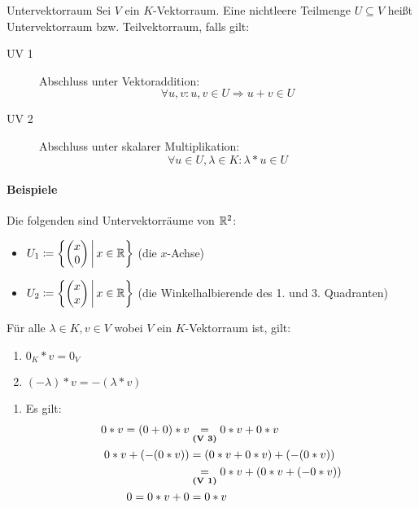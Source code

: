 \begin{definition}{Untervektorraum}
	Sei $V$ ein $K$-Vektorraum. Eine nichtleere Teilmenge $U\subseteq V$ heißt Untervektorraum bzw. Teilvektorraum, falls gilt:
	\begin{description}
	  \item[UV 1] Abschluss unter Vektoraddition:
	  \begin{equation*}
	    \forall u,v : u,v \in U \Rightarrow u+v\in U
	  \end{equation*}
	  \item[UV 2] Abschluss unter skalarer Multiplikation:
	  \begin{equation*}
	    \forall u\in U, \lambda\in K : \lambda* u \in U
	  \end{equation*}
	\end{description}
\end{definition}


\paragraph{Beispiele}
Die folgenden sind Untervektorräume von $\mathbb{R}^2$:
\begin{itemize}
  \item $U_1\coloneqq \left\{ \begin{pmatrix}x\\0\end{pmatrix} \,\middle|\, x\in\mathbb{R} \right\}$ (die $x$-Achse)
  \item $U_2\coloneqq \left\{ \begin{pmatrix}x\\x\end{pmatrix} \,\middle|\, x\in\mathbb{R} \right\}$ (die Winkelhalbierende des 1. und 3. Quadranten)
\end{itemize}


\begin{lemma}{}
  Für alle $\lambda \in K, v\in V$ wobei $V$ ein $K$-Vektorraum ist, gilt:
  \begin{enumerate}
    \item $0_K* v = 0_V$
    \item $(-\lambda)* v = -(\lambda* v)$
  \end{enumerate}
\end{lemma}
\beweis
\begin{enumerate}
  \item Es gilt:
  \begin{align*}
    0* v = (0+0)* v &\underset{\text{\textbf{(V 3)}}}{=}0* v+ 0* v\\
    0* v + (-(0* v)) &=(0* v + 0* v)+(-(0*v))\\
    &\underset{\text{\textbf{(V 1)}}}{=} 0*v+(0*v+(-0*v))\\
    0=0*v +0&=0*v
  \end{align*}
\end{enumerate}

